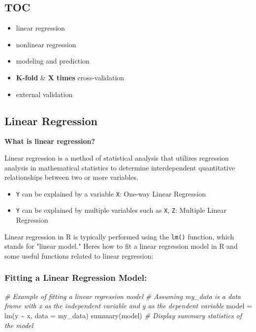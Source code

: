 \documentclass[
]{article}
\newenvironment{Shaded}{}{}
\newcommand{\AttributeTok}[1]{\textcolor[rgb]{0.49,0.56,0.16}{#1}}
\newcommand{\CommentTok}[1]{\textcolor[rgb]{0.38,0.63,0.69}{\textit{#1}}}
\newcommand{\FunctionTok}[1]{\textcolor[rgb]{0.02,0.16,0.49}{#1}}
\newcommand{\NormalTok}[1]{#1}
\newcommand{\OtherTok}[1]{\textcolor[rgb]{0.00,0.44,0.13}{#1}}
\newcommand{\SpecialCharTok}[1]{\textcolor[rgb]{0.25,0.44,0.63}{#1}}
\begin{document}
\hypertarget{toc-3}{%
\subsection{TOC}\label{toc-3}}

\begin{itemize}
\item
  linear regression
\item
  nonlinear regression
\item
  modeling and prediction
\item
  \textbf{K-fold} \& \textbf{X times} cross-validation
\item
  external validation
\end{itemize}

\hypertarget{linear-regression-2}{%
\subsection{Linear Regression}\label{linear-regression-2}}

\textbf{What is linear regression?}

Linear regression is a method of statistical analysis that utilizes
regression analysis in mathematical statistics to determine
interdependent quantitative relationships between two or more variables.

\begin{itemize}
\item
  \texttt{Y} can be explained by a variable \texttt{X}: One-way Linear
  Regression
\item
  \texttt{Y} can be explained by multiple variables such as \texttt{X},
  \texttt{Z}: Multiple Linear Regression
\end{itemize}

Linear regression in R is typically performed using the \texttt{lm()}
function, which stands for "linear model." Here\textquotesingle s how to
fit a linear regression model in R and some useful functions related to
linear regression:

\hypertarget{fitting-a-linear-regression-model}{%
\subsubsection{Fitting a Linear Regression
Model:}\label{fitting-a-linear-regression-model}}

\begin{Shaded}
\begin{Highlighting}[]
\CommentTok{\# Example of fitting a linear regression model}
\CommentTok{\# Assuming \textquotesingle{}my\_data\textquotesingle{} is a data frame with \textquotesingle{}x\textquotesingle{} as the independent variable and \textquotesingle{}y\textquotesingle{} as the dependent variable}
\NormalTok{model }\OtherTok{=} \FunctionTok{lm}\NormalTok{(y }\SpecialCharTok{\textasciitilde{}}\NormalTok{ x, }\AttributeTok{data =}\NormalTok{ my\_data)}
\FunctionTok{summary}\NormalTok{(model)  }\CommentTok{\# Display summary statistics of the model}
\end{Highlighting}
\end{Shaded}
\end{document}
